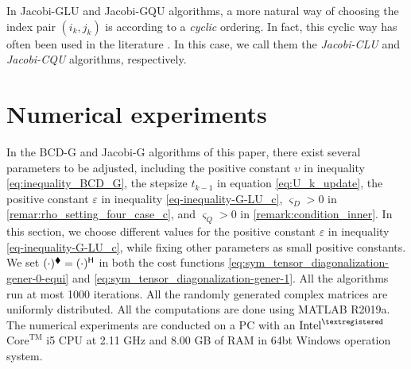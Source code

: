 \documentclass[final,onefignum,onetabnum]{siamart190516}
\renewcommand{\H}{{\sf H}} %
\renewcommand{\H}{{\sf H}}      %
\renewcommand{\TH}{{\blacklozenge}}
\begin{document}
\begin{remark}\label{remar:jacobi-c}
In Jacobi-GLU and Jacobi-GQU algorithms, a more natural way of choosing the index pair $(i_k,j_k)$ is according to a \emph{cyclic} ordering.
In fact, this cyclic way has often been used in the literature \cite{maurandi2014decoupled,sorensen2009approximate,wang2012complex}. 
In this case,
we call them the \emph{Jacobi-CLU} and \emph{Jacobi-CQU} algorithms, respectively.  
\end{remark}

\section{Numerical experiments}\label{sec-experiment-hooi}
In the BCD-G and Jacobi-G algorithms of this paper, there exist several parameters to be adjusted, including the positive constant $\upsilon$ in inequality \cref{eq:inequality_BCD_G},  the stepsize $t_{k-1}$ in equation \cref{eq:U_k_update}, the positive constant $\varepsilon$ in inequality \cref{eq-inequality-G-LU_c},  $\varsigma_{D}>0$ in \cref{remar:rho_setting_four_case_c}, and $\varsigma_{Q}>0$ in  \cref{remark:condition_inner}. 
In this section, we choose different values for the positive constant $\varepsilon$ in inequality \cref{eq-inequality-G-LU_c}, while fixing other parameters as small positive constants. 
We set $(\cdot)^\TH = (\cdot)^\H$ in both the cost functions \cref{eq:sym_tensor_diagonalization-gener-0-equi} and \cref{eq:sym_tensor_diagonalization-gener-1}. 
All the algorithms run at most 1000 iterations. All the randomly generated complex matrices are uniformly distributed. 
All the computations are done using MATLAB R2019a. 
The numerical experiments are conducted on a PC with an $\text{Intel}^{\textregistered}$ $\text{Core}^{\text{TM}}$ i5 CPU at 2.11 GHz and 8.00 GB of RAM in 64bt Windows operation system. 
\end{document}
